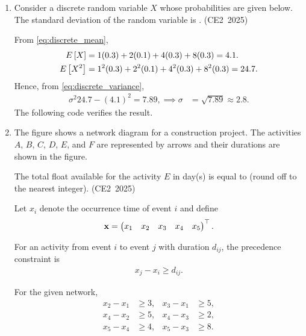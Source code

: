 \begin{enumerate}[label=\thesubsection.\arabic*, ref=\thesubsection.\theenumi,itemsep=0pt]

\fi

\item
Consider a discrete random variable $X$ whose probabilities are given below.
The standard deviation of the random variable is \underline{\hspace{2cm}}
.
\hfill (CE2~2025)
\begin{table}[H]
	\centering
	
	\caption{Probability table}
	\label{tab:Probability_table}
\end{table}

%
\solution
		From \eqref{eq:discrete_mean},
\begin{align}
	E\left[ X \right]&=1(0.3)+2(0.1)+4(0.3)+8(0.3)=4.1.
	\\
E\left[ X^2 \right]
&=1^2(0.3)+2^2(0.1)+4^2(0.3)+8^2(0.3)=24.7.
\end{align}
Hence, from 
	\eqref{eq:discrete_variance},
\begin{align}
\sigma^2
24.7-(4.1)^2=7.89,
\implies 
\sigma
&=\sqrt{7.89}\approx2.8.
\end{align}
The following code verifies the result.
%
\item
The figure shows a network diagram for a construction project. The activities
$A$, $B$, $C$, $D$, $E$, and $F$ are represented by arrows and their durations
are shown in the figure.

The total float available for the activity $E$ in day(s) is equal to
\underline{\hspace{2cm}} (round off to the nearest integer).
\hfill (CE2~2025)

\solution
Let $x_i$ denote the occurrence time of event $i$ and define
\begin{align}
\mathbf{x}
=
\begin{pmatrix}
x_1&x_2&x_3&x_4&x_5
\end{pmatrix}^{\top}.
\end{align}

For an activity from event $i$ to event $j$ with duration $d_{ij}$,
the precedence constraint is
\begin{align}
x_j-x_i\ge d_{ij}.
\end{align}

For the given network,
\begin{align}
x_2-x_1&\ge3, &
x_3-x_1&\ge5,\\
x_4-x_2&\ge5, &
x_4-x_3&\ge2,\\
x_5-x_4&\ge4, &
x_5-x_3&\ge8.
\end{align}


\end{enumerate}
